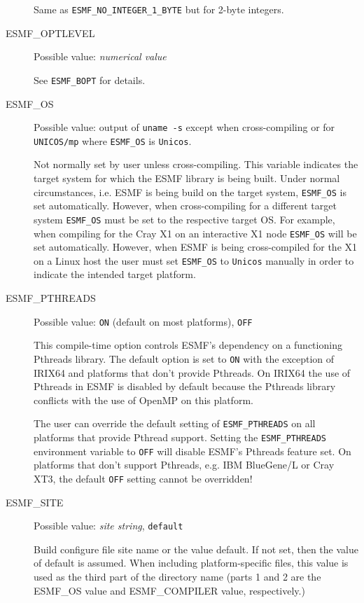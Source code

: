\begin{description}
Same as {\tt ESMF\_NO\_INTEGER\_1\_BYTE} but for 2-byte integers.

\item[ESMF\_OPTLEVEL] 
Possible value: {\em numerical value}

See {\tt ESMF\_BOPT} for details.

\item[ESMF\_OS]
Possible value: output of {\tt uname -s} except when cross-compiling or for
{\tt UNICOS/mp} where {\tt ESMF\_OS} is {\tt Unicos}.

Not normally set by user unless cross-compiling. This variable indicates the
target system for which the ESMF library is being built. Under normal
circumstances, i.e. ESMF is being build on the target system, {\tt ESMF\_OS} is
set automatically. However, when cross-compiling for a different target system
{\tt ESMF\_OS} must be set to the respective target OS. For example, when
compiling for the Cray X1 on an interactive X1 node {\tt ESMF\_OS} will be set
automatically. However, when ESMF is being cross-compiled for the X1 on a Linux
host the user must set {\tt ESMF\_OS} to {\tt Unicos} manually in order to
indicate the intended target platform.

\item[ESMF\_PTHREADS]
Possible value: {\tt ON} (default on most platforms), {\tt OFF}

This compile-time option controls ESMF's dependency on a functioning
Pthreads library. The default option is set to {\tt ON} with the exception
of IRIX64 and platforms that don't provide Pthreads. On IRIX64 the use of
Pthreads in ESMF is disabled by default because the Pthreads library conflicts
with the use of OpenMP on this platform.

The user can override the default setting of {\tt ESMF\_PTHREADS} on all
platforms that provide Pthread support. Setting the {\tt ESMF\_PTHREADS}
environment variable to {\tt OFF} will disable ESMF's Pthreads feature set.
On platforms that don't support Pthreads, e.g. IBM BlueGene/L or Cray XT3, the
default {\tt OFF} setting cannot be overridden!
 
\item[ESMF\_SITE]
Possible value: {\em site string}, {\tt default}

Build configure file site name or the value default. If not set, then the value
of default is assumed. When including platform-specific files, this value is 
used as the third part of the directory name (parts 1 and 2 are the
ESMF\_OS value and ESMF\_COMPILER value, respectively.)


\end{description}
